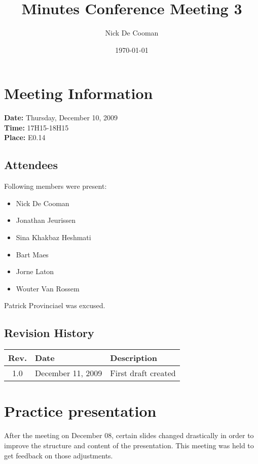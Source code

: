 \documentclass[a4paper, 12pt]{article}
\begin{document}
\title{Minutes Conference Meeting 3}
\author{Nick De Cooman}
\date{\today}

\maketitle	
	\section{Meeting Information}
		\textbf{Date:} Thursday, December 10, 2009\\
		\textbf{Time:} 17H15-18H15\\
		\textbf{Place:} E0.14\\
		
		\subsection{Attendees}
Following members were present:
			\begin{itemize}
				\item Nick De Cooman
				\item Jonathan Jeurissen
				\item Sina Khakbaz Heshmati
				\item Bart Maes
				\item Jorne Laton
				\item Wouter Van Rossem
			\end{itemize}
Patrick Provinciael was excused.
			
		\subsection{Revision History}
			\begin{tabular}{c | l | l }
				\textbf{Rev.} & \textbf{Date} & \textbf{Description} \\
				\hline
				1.0 & December 11, 2009 & First draft created \\

			\end{tabular}		

\section{Practice presentation}

After the meeting on December 08, certain slides changed drastically in order to improve the structure and content of the presentation. This meeting was held to get feedback on those adjustments. 
\end{document}
